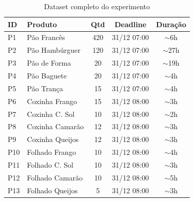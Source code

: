 \documentclass[12pt,a4paper]{article}
\theoremstyle{definition}
\begin{document}
\begin{table}[H]
\centering
\small
\begin{tabular}{@{}llccc@{}}
\toprule
\textbf{ID} & \textbf{Produto} & \textbf{Qtd} & \textbf{Deadline} & \textbf{Duração} \\
\midrule
P1 & Pão Francês & 420 & 31/12 07:00 & $\sim$6h \\
P2 & Pão Hambúrguer & 120 & 31/12 07:00 & $\sim$27h \\
P3 & Pão de Forma & 20 & 31/12 07:00 & $\sim$19h \\
P4 & Pão Baguete & 20 & 31/12 07:00 & $\sim$4h \\
P5 & Pão Trança & 15 & 31/12 07:00 & $\sim$4h \\
P6 & Coxinha Frango & 15 & 31/12 08:00 & $\sim$3h \\
P7 & Coxinha C. Sol & 10 & 31/12 08:00 & $\sim$2h \\
P8 & Coxinha Camarão & 12 & 31/12 08:00 & $\sim$3h \\
P9 & Coxinha Queijos & 12 & 31/12 08:00 & $\sim$3h \\
P10 & Folhado Frango & 10 & 31/12 08:00 & $\sim$4h \\
P11 & Folhado C. Sol & 10 & 31/12 08:00 & $\sim$3h \\
P12 & Folhado Camarão & 10 & 31/12 08:00 & $\sim$5h \\
P13 & Folhado Queijos & 5 & 31/12 08:00 & $\sim$3h \\
\bottomrule
\end{tabular}
\caption{Dataset completo do experimento}
\label{tab:dataset}
\end{table}
\end{document}
